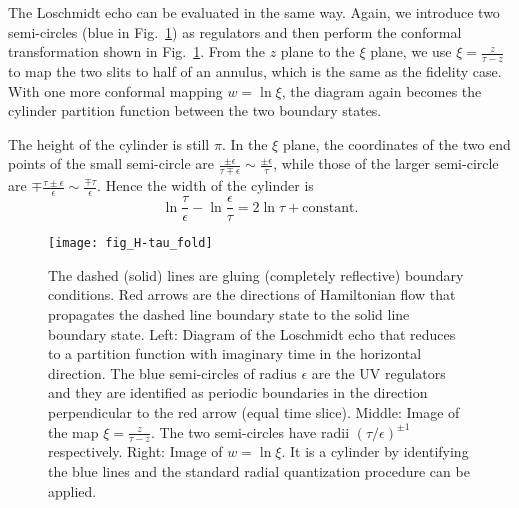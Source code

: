 The Loschmidt echo can be evaluated in the same way. Again, we introduce two semi-circles (blue in Fig.~\ref{fig:H-tau_fold}) as regulators and then perform the conformal transformation shown in Fig.~\ref{fig:H-tau_fold}. From the $z$ plane to the $\xi$ plane, we use $\xi = \frac{z}{\tau - z}$ to map the two slits to half of an annulus, which is the same as the fidelity case. With one more conformal mapping $w = \ln \xi$, the diagram again becomes the cylinder partition function between the two boundary states. 

The height of the cylinder is still $\pi$. In the $\xi$ plane, the coordinates of the two end points of the small semi-circle are $\frac{\pm \epsilon}{ \tau \mp \epsilon} \sim \frac{\pm \epsilon}{ \tau }$, while those of the larger semi-circle are $\mp \frac{\tau \pm \epsilon}{\epsilon} \sim \frac{\mp \tau}{\epsilon}$. Hence the width of the cylinder is
\begin{equation}
\label{eq:echo_cyd_width}
\ln \frac{\tau}{\epsilon} - \ln \frac{\epsilon}{\tau } = 2 \ln \tau + \text{constant}.  
\end{equation}

\begin{figure}[htb]
\centering
\texttt{[image: fig\_H-tau\_fold]}
\caption{The dashed (solid) lines are gluing (completely reflective) boundary conditions. Red arrows are the directions of Hamiltonian flow that propagates the dashed line boundary state to the solid line boundary state. Left: Diagram of the Loschmidt echo that reduces to a partition function with imaginary time in the horizontal direction. The blue semi-circles of radius $\epsilon$ are the UV regulators and they are identified as periodic boundaries in the direction perpendicular to the red arrow (equal time slice). Middle: Image of the map $\xi = \frac{z}{\tau - z}$. The two semi-circles have radii $({\tau}/{\epsilon})^{\pm1}$ respectively.  Right: Image of $w = \ln \xi$. It is a cylinder by identifying the blue lines and the standard radial quantization procedure can be applied. }
\label{fig:H-tau_fold}
\end{figure}


